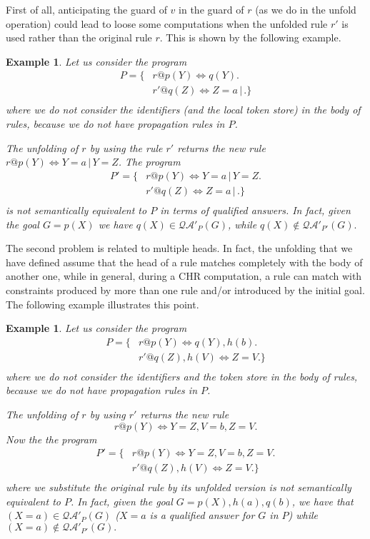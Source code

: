 \documentclass[final]{acmtrans2e}
\newtheorem{exa}[theorem]{Example}
\newenvironment{example}{\begin{exa}}{\end{exa}}
\begin{document}
First of all, anticipating the guard of $v$ in the guard of $r$
(as we do in the unfold operation) could lead to loose some
computations  when the unfolded rule $r'$  is used rather than the
original rule $r$. This is shown by the following example.




\begin{example}\label{esempio:mau}
Let us consider the program
\[\begin{array}{rlll}
  P= \{ &r  @ p(Y)  \Leftrightarrow q(Y).\\
  & r' @ q(Z) \Leftrightarrow  Z=a \,|\, .\}\\
\end{array}
\]
where we do not consider the identifiers (and the local token store) in
the body of rules, because we do not have propagation rules in
$P$.

The unfolding  of $r$ by using the rule $r'$ returns the new
rule $r @ p(Y) \Leftrightarrow Y=a  \,|\,  Y=Z$. The
program
\[\begin{array}{rlll}
  P'= \{ &r @ p(Y)  \Leftrightarrow Y=a  \,|\,  Y=Z.\\
 & r' @ q(Z) \Leftrightarrow  Z=a  \,|\,. \}\\
\end{array}
\]
is not semantically equivalent to $P$ in terms of qualified
answers. In fact, given the goal $G= p(X)$ we have $q(X) \in
\mathcal{QA'}_P(G)$, while $q(X) \not \in \mathcal{QA'}_{P'}(G).$
\end{example}


The second problem is related to multiple heads. In fact, the
unfolding that we have defined  assume that the head of a rule
matches completely with the body of another one, while in general,
during a CHR computation, a rule can match with constraints
produced by more than one rule and/or  introduced by the initial
goal. The following example illustrates this point.

\begin{example}\label{ex:unicatesta}
Let us consider the program
\[\begin{array}{rlll}
  P= \{ &r  @ p(Y)  \Leftrightarrow  q(Y), h(b).\\
  & r' @ q(Z), h(V) \Leftrightarrow  Z=V .\}\\
\end{array}
\]
where we do not consider the identifiers and the token store in
the body of rules, because we do not have propagation rules in
$P$.

The unfolding  of $r$ by using  $r'$ returns the new
rule
$$r @ p(Y) \Leftrightarrow  Y=Z, V=b, Z=V. $$ Now the
the program
\[\begin{array}{rlll}
  P'= \{ &r @ p(Y)  \Leftrightarrow Y=Z, V=b, Z=V .\\
  & r'  @  q(Z), h(V) \Leftrightarrow   Z=V .\}\\
\end{array}
\]
where we substitute the original rule by its  unfolded version is
not semantically equivalent to $P$. In fact, given the goal $G=
p(X), h(a), q(b)$, we have that  $(X=a )\in \mathcal{QA'}_P(G)$
($X=a$ is a qualified answer for $G$ in $P$) while $(X=a) \not \in
\mathcal{QA'}_{P'}(G).$
\end{example}
\end{document}
